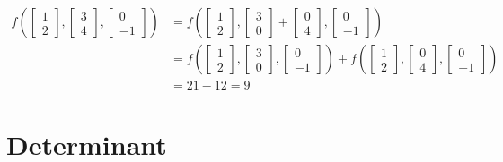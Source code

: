 \documentclass{report}
\begin{document}
$$
\begin{aligned}
f\left(\begin{bmatrix} 1 \\ 2 \end{bmatrix}, \begin{bmatrix} 3 \\ 4 \end{bmatrix}, \begin{bmatrix} 0 \\ -1 \end{bmatrix} \right) & =
f\left(\begin{bmatrix} 1 \\ 2 \end{bmatrix}, \begin{bmatrix} 3 \\ 0 \end{bmatrix} + \begin{bmatrix} 0 \\ 4 \end{bmatrix}, \begin{bmatrix} 0 \\ -1 \end{bmatrix} \right) \\
& = f\left(\begin{bmatrix} 1 \\ 2 \end{bmatrix}, \begin{bmatrix} 3 \\ 0 \end{bmatrix}, \begin{bmatrix} 0 \\ -1 \end{bmatrix} \right) +
f\left(\begin{bmatrix} 1 \\ 2 \end{bmatrix}, \begin{bmatrix} 0 \\ 4 \end{bmatrix}, \begin{bmatrix} 0 \\ -1 \end{bmatrix} \right) \\
& = 21 - 12 = 9
\end{aligned}
$$
\section{Determinant}
\end{document}
